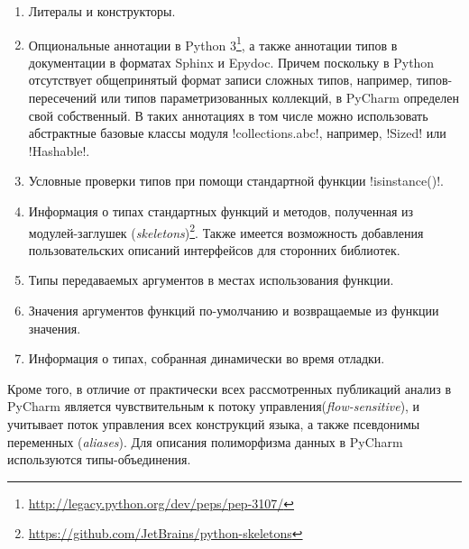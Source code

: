 \begin{enumerate}
    \item Литералы и конструкторы.

    \item Опциональные аннотации в Python
      3\footnote{\url{http://legacy.python.org/dev/peps/pep-3107/}}, а также
      аннотации типов в документации в форматах Sphinx и Epydoc. Причем поскольку в
      Python отсутствует общепринятый формат записи сложных типов, например,
      типов-пересечений или типов параметризованных коллекций, в PyCharm
      определен свой собственный.
      В таких аннотациях в том числе можно использовать абстрактные базовые
      классы модуля !collections.abc!, например, !Sized! или !Hashable!.

    \item Условные проверки типов при помощи стандартной функции !isinstance()!.

    \item Информация о типах стандартных функций и методов, полученная из
        модулей-заглушек
        (\emph{skeletons})\footnote{\url{https://github.com/JetBrains/python-skeletons}}.
        Также имеется возможность добавления пользовательских описаний
        интерфейсов для сторонних библиотек.

    \item Типы передаваемых аргументов в местах использования функции.

    \item Значения аргументов функций по-умолчанию и возвращаемые из функции
        значения.

    \item Информация о типах, собранная динамически во время отладки.
\end{enumerate}

Кроме того, в отличие от практически всех рассмотренных публикаций анализ в
PyCharm является чувствительным к потоку управления(\emph{flow-sensitive}), и 
учитывает поток управления всех конструкций языка, а также псевдонимы
переменных (\emph{aliases}). Для описания полиморфизма данных в PyCharm
используются типы-объединения. 


